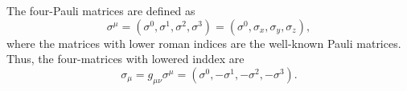 \documentclass{scrarticle}
\begin{document}
\begin{remark}
  The four-Pauli matrices are defined as
  \begin{equation}
    \label{eq:7}
    \sigma^{\mu} = (\sigma^0, \sigma^1, \sigma^2, \sigma^{3}) = (\sigma^0, \sigma_x, \sigma_y, \sigma_z),
  \end{equation}
  where the matrices with lower roman indices are the well-known Pauli matrices.
  Thus, the four-matrices with lowered inddex are
  \begin{equation}
    \label{eq:8}
    \sigma_{\mu} = g_{\mu \nu} \sigma^{\mu} = (\sigma^0, -\sigma^1, -\sigma^2, -\sigma^{3}).
  \end{equation}
\end{remark}
\end{document}
